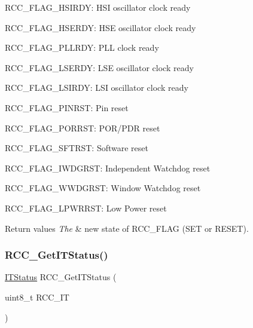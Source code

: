 \begin{DoxyItemize}
\item R\+C\+C\+\_\+\+F\+L\+A\+G\+\_\+\+H\+S\+I\+R\+DY\+: H\+SI oscillator clock ready \item R\+C\+C\+\_\+\+F\+L\+A\+G\+\_\+\+H\+S\+E\+R\+DY\+: H\+SE oscillator clock ready \item R\+C\+C\+\_\+\+F\+L\+A\+G\+\_\+\+P\+L\+L\+R\+DY\+: P\+LL clock ready \item R\+C\+C\+\_\+\+F\+L\+A\+G\+\_\+\+L\+S\+E\+R\+DY\+: L\+SE oscillator clock ready \item R\+C\+C\+\_\+\+F\+L\+A\+G\+\_\+\+L\+S\+I\+R\+DY\+: L\+SI oscillator clock ready \item R\+C\+C\+\_\+\+F\+L\+A\+G\+\_\+\+P\+I\+N\+R\+ST\+: Pin reset \item R\+C\+C\+\_\+\+F\+L\+A\+G\+\_\+\+P\+O\+R\+R\+ST\+: P\+O\+R/\+P\+DR reset \item R\+C\+C\+\_\+\+F\+L\+A\+G\+\_\+\+S\+F\+T\+R\+ST\+: Software reset \item R\+C\+C\+\_\+\+F\+L\+A\+G\+\_\+\+I\+W\+D\+G\+R\+ST\+: Independent Watchdog reset \item R\+C\+C\+\_\+\+F\+L\+A\+G\+\_\+\+W\+W\+D\+G\+R\+ST\+: Window Watchdog reset \item R\+C\+C\+\_\+\+F\+L\+A\+G\+\_\+\+L\+P\+W\+R\+R\+ST\+: Low Power reset\end{DoxyItemize}

\begin{DoxyRetVals}{Return values}
{\em The} & new state of R\+C\+C\+\_\+\+F\+L\+AG (S\+ET or R\+E\+S\+ET). \\
\hline
\end{DoxyRetVals}
\mbox{\label{group___r_c_c___exported___functions_ga6126c99f398ee4be410ad76ae3aee18f}} 
\subsubsection{\texorpdfstring{RCC\_GetITStatus()}{RCC\_GetITStatus()}}
{\footnotesize\ttfamily \mbox{\hyperlink{group___exported__types_gaacbd7ed539db0aacd973a0f6eca34074}{I\+T\+Status}} R\+C\+C\+\_\+\+Get\+I\+T\+Status (\begin{DoxyParamCaption}\item[{uint8\+\_\+t}]{R\+C\+C\+\_\+\+IT }\end{DoxyParamCaption})}



